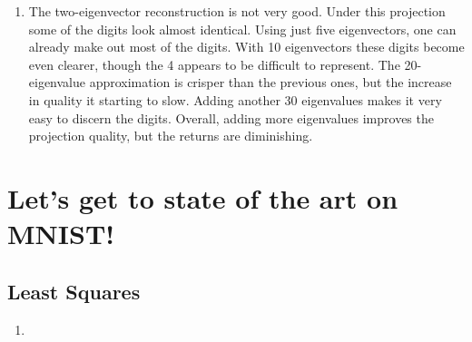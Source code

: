 \documentclass{article}
\begin{document}
\begin{enumerate}
    \begin{figure}
    	\centering
        \begin{subfigure}[b]{0.95\textwidth}
        	\centering
        	\texttt{[image: 10evRecon]}
        	\caption{Reconstruction with 10 eigenvectors}
        	\label{fig:10ev}
        \end{subfigure}
        \begin{subfigure}[b]{0.95\textwidth}
        	\centering
        	\texttt{[image: 20evRecon]}
        	\caption{Reconstruction with 20 eigenvectors}
        	\label{fig:20ev}
        \end{subfigure}
        \begin{subfigure}[b]{0.95\textwidth}
        	\centering
        	\texttt{[image: 50evRecon]}
        	\caption{Reconstruction with 50 eigenvectors}
        	\label{fig:50ev}
        \end{subfigure}
        \caption{Reconstructions of MNIST images using different numbers of eigenvectors} 
        \label{fig:evRecons2}
    \end{figure}
    Figure \ref{fig:evRecons1} shows the reconstructions produced using two and five eigenvectors, respectively. Figure \ref{fig:evRecons2} visualizes the reconstructions utilizing 10, 20, and 50 eigenvectors, respectively.
    \item The two-eigenvector reconstruction is not very good. Under this projection some of the digits look almost identical. Using just five eigenvectors, one can already make out most of the digits. With 10 eigenvectors these digits become even clearer, though the 4 appears to be difficult to represent. The 20-eigenvalue approximation is crisper than the previous ones, but the increase in quality it starting to slow. Adding another 30 eigenvalues makes it very easy to discern the digits. Overall, adding more eigenvalues improves the projection quality, but the returns are diminishing.
\end{enumerate}


\section{Let's get to state of the art on MNIST!}
\subsection{Least Squares}
\begin{enumerate}
	\item 
\end{enumerate}
\end{document}
